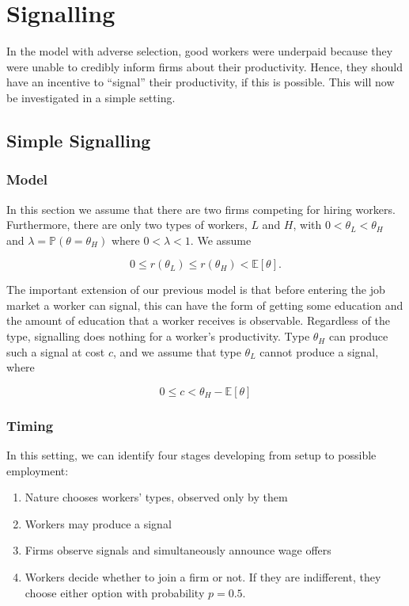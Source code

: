 \documentclass[11pt]{article}
\begin{document}
\section{Signalling}

In the model with adverse selection, good workers were underpaid because they were unable to credibly inform firms about their productivity. Hence, they should have an incentive to \enquote{signal} their productivity, if this is possible. This will now be investigated in a simple setting.

\subsection{Simple Signalling}

\subsubsection{Model}

In this section we assume that there are two firms competing for hiring workers. Furthermore, there are only two types of workers, $L$ and $H$, with $0 < \theta_L < \theta_H$ and $\lambda = \mathbb{P}(\theta = \theta_H)$ where $0 < \lambda < 1$. We assume 

	$$ 0 \leq r(\theta_L) \leq r(\theta_H) < \mathbb{E}[\theta]. $$

The important extension of our previous model is that before entering the job market a worker can signal, this can have the form of getting some education and the amount of education that a worker receives is observable. Regardless of the type, signalling does nothing for a worker's productivity. Type $\theta_H$  can produce such a signal at cost $c$, and we assume that type $\theta_L$ cannot produce a signal, where

	$$ 0 \leq c < \theta_H - \mathbb{E}[\theta] $$

\subsubsection{Timing}

In this setting, we can identify four stages developing from setup to possible employment:

\begin{enumerate}
	\item Nature chooses workers' types, observed only by them
	\item Workers may produce a signal
	\item Firms observe signals and simultaneously announce wage offers
	\item Workers decide whether to join a firm or not. If they are indifferent, they choose either option with probability $p = 0.5$.
\end{enumerate}
\end{document}
